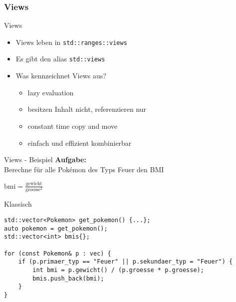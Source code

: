 \subsubsection{Views}

\begin{frame}{Views}
    \begin{itemize}
        \item<1-> Views leben in \texttt{std::ranges::views}
        \item<2-> Es gibt den alias \texttt{std::views}
        \item<3-> Was kennzeichnet Views aus?
            \begin{itemize}
                \item<4-> lazy evaluation
                \item<5-> besitzen Inhalt nicht, referenzieren nur
                \item<6-> constant time copy and move
                \item<7-> einfach und effizient kombinierbar
            \end{itemize}
    \end{itemize}
\end{frame}


\begin{frame}{Views - Beispiel}
    \textbf{Aufgabe:}\\
    Berechne für alle Pokémon des Typs Feuer den BMI

    \vspace{2.5em}

    \begin{center}
        $\text{bmi} = \frac{\text{gewicht}}{\text{groesse}^2}$
    \end{center}
\end{frame}

\begin{frame}[fragile]{Klassisch}
    \begin{verbatim}
std::vector<Pokemon> get_pokemon() {...};
auto pokemon = get_pokemon();
std::vector<int> bmis{};

for (const Pokemon& p : vec) {
    if (p.primaer_typ == "Feuer" || p.sekundaer_typ = "Feuer") {
        int bmi = p.gewicht() / (p.groesse * p.groesse);
        bmis.push_back(bmi);
    }
}
    \end{verbatim}
\end{frame}

